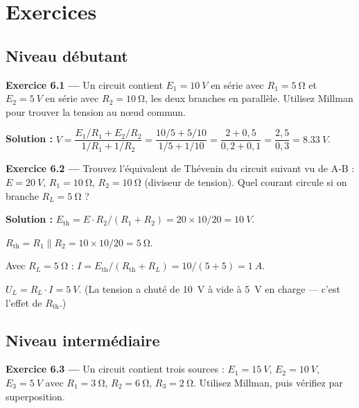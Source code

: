 \documentclass[12pt,a4paper,twoside]{book}
\begin{document}
\section*{Exercices}

\subsection*{Niveau débutant}

\textbf{Exercice 6.1 ---} Un circuit contient $E_1 = \SI{10}{V}$ en série avec $R_1 = \SI{5}{\ohm}$ et $E_2 = \SI{5}{V}$ en série avec $R_2 = \SI{10}{\ohm}$, les deux branches en parallèle. Utilisez Millman pour trouver la tension au n\oe ud commun.

\begin{pratique}
\textbf{Solution :} $V = \dfrac{E_1/R_1 + E_2/R_2}{1/R_1 + 1/R_2} = \dfrac{10/5 + 5/10}{1/5 + 1/10} = \dfrac{2 + 0{,}5}{0{,}2 + 0{,}1} = \dfrac{2{,}5}{0{,}3} = \SI{8.33}{V}$.
\end{pratique}

\textbf{Exercice 6.2 ---} Trouvez l'équivalent de Thévenin du circuit suivant vu de A-B : $E = \SI{20}{V}$, $R_1 = \SI{10}{\ohm}$, $R_2 = \SI{10}{\ohm}$ (diviseur de tension). Quel courant circule si on branche $R_L = \SI{5}{\ohm}$ ?

\begin{pratique}
\textbf{Solution :} $E_{\text{th}} = E \cdot R_2/(R_1+R_2) = 20 \times 10/20 = \SI{10}{V}$.

$R_{\text{th}} = R_1 \parallel R_2 = 10 \times 10 / 20 = \SI{5}{\ohm}$.

Avec $R_L = \SI{5}{\ohm}$ : $I = E_{\text{th}}/(R_{\text{th}} + R_L) = 10/(5+5) = \SI{1}{A}$.

$U_L = R_L \cdot I = \SI{5}{V}$. (La tension a chuté de \SI{10}{V} à vide à \SI{5}{V} en charge --- c'est l'effet de $R_{\text{th}}$.)
\end{pratique}

\subsection*{Niveau intermédiaire}

\textbf{Exercice 6.3 ---} Un circuit contient trois sources : $E_1 = \SI{15}{V}$, $E_2 = \SI{10}{V}$, $E_3 = \SI{5}{V}$ avec $R_1 = \SI{3}{\ohm}$, $R_2 = \SI{6}{\ohm}$, $R_3 = \SI{2}{\ohm}$. Utilisez Millman, puis vérifiez par superposition.
\end{document}
